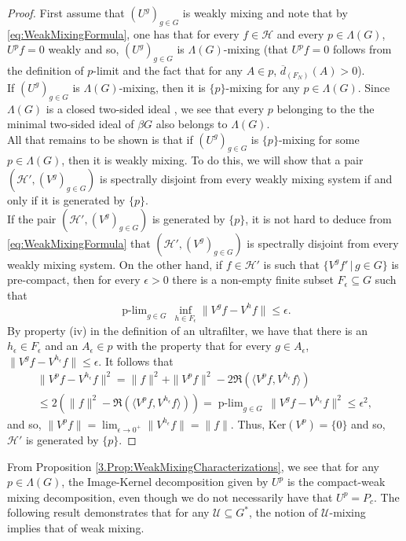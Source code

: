 \documentclass[graybox]{svmult}
\theoremstyle{definition}
\newcommand{\plimgG}[3]{\mathop {#1\text{-lim}}_{#2\in #3}\,}
\begin{document}
\begin{proof}
First assume that $(U^g)_{g\in G}$ is weakly mixing and note that by \eqref{eq:WeakMixingFormula}, one has that for every $f\in\mathcal H$ and every $p\in \Lambda(G)$, $U^p f=0$ weakly and so, $(U^g)_{g\in G}$ is $\Lambda(G)$-mixing (that $U^pf=0$ follows from the definition of $p$-limit and the fact that for any $A\in p$, $\overline d_{(F_N)}(A)>0$).\\
If $(U^g)_{g\in G}$ is $\Lambda(G)$-mixing, then it is $\{p\}$-mixing for any $p\in\Lambda(G)$. Since $\Lambda(G)$ is a closed two-sided ideal \cite[Theorem 2.8]{glasscock2025folner}, we see that every $p$ belonging to the the minimal two-sided ideal of $\beta G$ also belongs to $\Lambda(G)$. \\
All that remains to be shown is  that if $(U^g)_{g\in G}$ is $\{p\}$-mixing for some $p\in \Lambda(G)$, then it is weakly mixing. To do this, we will show that a pair $(\mathcal H',(V^g)_{g\in G})$ is spectrally disjoint from every weakly mixing system if and only if it is generated by $\{p\}$.\\
If the pair $(\mathcal H',(V^g)_{g\in G})$ is generated by $\{p\}$, it is not hard to deduce from \eqref{eq:WeakMixingFormula} that  $(\mathcal H',(V^g)_{g\in G})$  is spectrally disjoint from every weakly mixing system. On the other hand, if $f\in\mathcal H'$ is such that $\{V^gf'\,|\,g\in G\}$ is pre-compact, then for every $\epsilon>0$ there is a non-empty finite subset $F_\epsilon\subseteq G$ such that 
$$
\plimgG{p}{g}{G}\inf_{h\in F_\epsilon}\|V^gf-V^hf\|\leq\epsilon.
$$
By property (iv) in the definition of an ultrafilter, we have that there is an $h_\epsilon \in F_\epsilon$ and an $A_\epsilon\in p$ with the property that for every $g\in A_\epsilon$, $\|V^gf-V^{h_\epsilon}f\|\leq\epsilon$. It follows that  
\begin{multline*}
    \|V^pf-V^{h_\epsilon}f\|^2=\|f\|^2+\|V^pf\|^2-2\Re(\langle V^pf,V^{h_\epsilon}f \rangle )\\
    \leq 2(\|f\|^2-\Re(\langle V^pf,V^{h_\epsilon}f \rangle ))=\plimgG{p}{g}{G}\|V^gf-V^{h_\epsilon}f\|^2\leq \epsilon^2,
\end{multline*}
and so, $\|V^pf\|=\lim_{\epsilon\rightarrow 0^+}\|V^{h_\epsilon}f\|=\|f\|$. Thus, $\text{Ker}(V^p)=\{0\}$ and so, $\mathcal H'$ is generated by $\{p\}$.
\end{proof}
From Proposition \ref{3.Prop:WeakMixingCharacterizations}, we see that for any $p \in \Lambda(G)$, the Image-Kernel decomposition given by $U^p$ is the compact-weak mixing decomposition, even though we do not necessarily have that $U^p = P_c$. The following result  demonstrates that for any $\mathcal U\subseteq G^*$, the notion of $\mathcal U$-mixing implies that of weak mixing. 
\end{document}
